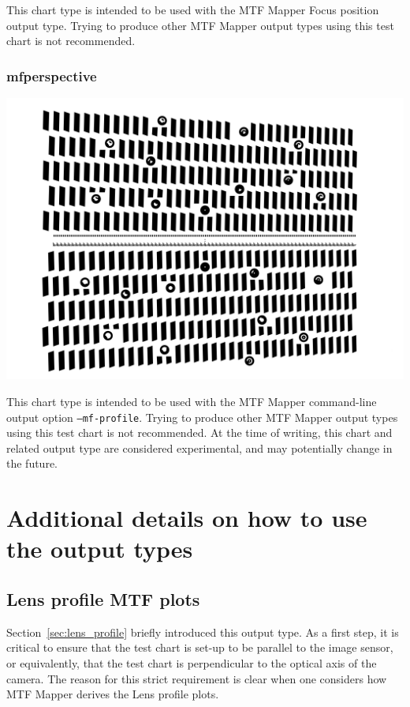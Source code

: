 \documentclass[a4paper]{article}
\begin{document}
This chart type is intended to be used with the MTF Mapper \textsf{Focus
position} output type. Trying to produce other MTF Mapper output types using
this test chart is not recommended.

\subsubsection{mfperspective}

\parbox{\textwidth}{
\centering
\includegraphics[width=\textwidth]{figures/chart_mfperspective}
}

This chart type is intended to be used with the MTF Mapper command-line
output option \texttt{--mf-profile}. 
Trying to produce other MTF Mapper output types using this test chart is not recommended.
At the time of writing, this chart and related output type are considered
experimental, and may potentially change in the future.

\newpage

\section{Additional details on how to use the output types}

\subsection{Lens profile MTF plots}
Section~\ref{sec:lens_profile} briefly introduced this output type. As a
first step, it is critical to ensure that the test chart is set-up to be
parallel to the image sensor, or equivalently, that the test chart is
perpendicular to the optical axis of the camera. The reason for this strict
requirement is clear when one considers how MTF Mapper derives the
\textsf{Lens profile} plots.
\end{document}
